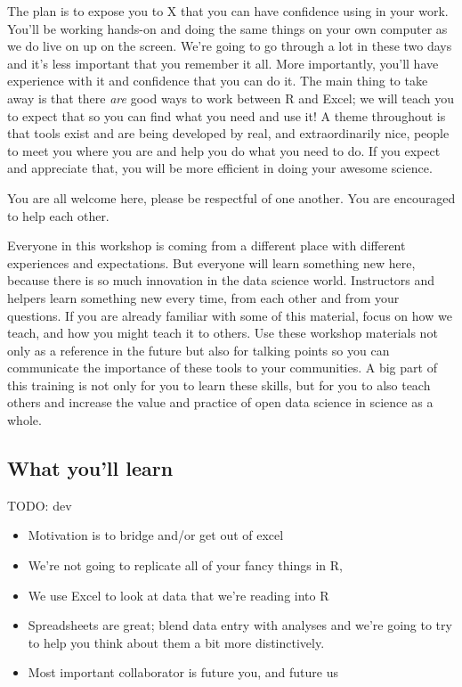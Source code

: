 \documentclass[]{book}
\providecommand{\tightlist}{%
  \setlength{\itemsep}{0pt}\setlength{\parskip}{0pt}}
\begin{document}
The plan is to expose you to X that you can have confidence using in your work. You'll be working hands-on and doing the same things on your own computer as we do live on up on the screen. We're going to go through a lot in these two days and it's less important that you remember it all. More importantly, you'll have experience with it and confidence that you can do it. The main thing to take away is that there \emph{are} good ways to work between R and Excel; we will teach you to expect that so you can find what you need and use it! A theme throughout is that tools exist and are being developed by real, and extraordinarily nice, people to meet you where you are and help you do what you need to do. If you expect and appreciate that, you will be more efficient in doing your awesome science.

You are all welcome here, please be respectful of one another. You are encouraged to help each other.

Everyone in this workshop is coming from a different place with different experiences and expectations. But everyone will learn something new here, because there is so much innovation in the data science world. Instructors and helpers learn something new every time, from each other and from your questions. If you are already familiar with some of this material, focus on how we teach, and how you might teach it to others. Use these workshop materials not only as a reference in the future but also for talking points so you can communicate the importance of these tools to your communities. A big part of this training is not only for you to learn these skills, but for you to also teach others and increase the value and practice of open data science in science as a whole.

\hypertarget{what-youll-learn}{%
\subsection{What you'll learn}\label{what-youll-learn}}

TODO: dev

\begin{itemize}
\tightlist
\item
  Motivation is to bridge and/or get out of excel
\item
  We're not going to replicate all of your fancy things in R,
\item
  We use Excel to look at data that we're reading into R
\item
  Spreadsheets are great; blend data entry with analyses and we're going to try to help you think about them a bit more distinctively.
\item
  Most important collaborator is future you, and future us
\end{itemize}
\end{document}
